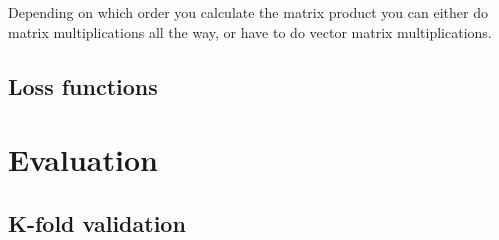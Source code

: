 Depending on which order you calculate the matrix product you can either do matrix multiplications all the way, or have to do vector matrix multiplications.\\
\cite{snoekPracticalBayesianOptimization}
\cite{geigerScalingDescriptionGeneralization2020}
\subsection{Loss functions}
\cite{mullerWhenDoesLabel}

\newpage
\section{Evaluation}
\cite{zintgrafVisualizingDeepNeural2017}
\cite{rendleDifficultyEvaluatingBaselines2019}
\subsection{K-fold validation}
